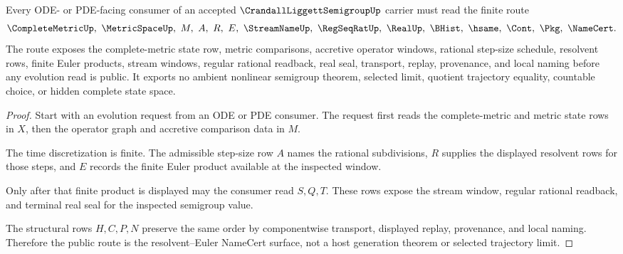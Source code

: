 \begin{theorem}
\label{thm:crandall-liggett-semigroup-resolvent-euler-route}
Every ODE- or PDE-facing consumer of an accepted $\CrandallLiggettSemigroupUp$ carrier must read the finite route
$$
\CompleteMetricUp,\ \MetricSpaceUp,\ M,\ A,\ R,\ E,\ \StreamNameUp,\ \RegSeqRatUp,\ \RealUp,\ \BHist,\ \hsame,\ \Cont,\ \Pkg,\ \NameCert .
$$
The route exposes the complete-metric state row, metric comparisons, accretive operator windows, rational step-size schedule, resolvent rows, finite Euler products, stream windows, regular rational readback, real seal, transport, replay, provenance, and local naming before any evolution read is public. It exports no ambient nonlinear semigroup theorem, selected limit, quotient trajectory equality, countable choice, or hidden complete state space.
\end{theorem}
\begin{proof}
Start with an evolution request from an ODE or PDE consumer. The request first reads the complete-metric and metric state rows in $X$, then the operator graph and accretive comparison data in $M$.

The time discretization is finite. The admissible step-size row $A$ names the rational subdivisions, $R$ supplies the displayed resolvent rows for those steps, and $E$ records the finite Euler product available at the inspected window.

Only after that finite product is displayed may the consumer read $S,Q,T$. These rows expose the stream window, regular rational readback, and terminal real seal for the inspected semigroup value.

The structural rows $H,C,P,N$ preserve the same order by componentwise transport, displayed replay, provenance, and local naming. Therefore the public route is the resolvent--Euler NameCert surface, not a host generation theorem or selected trajectory limit.
\end{proof}




